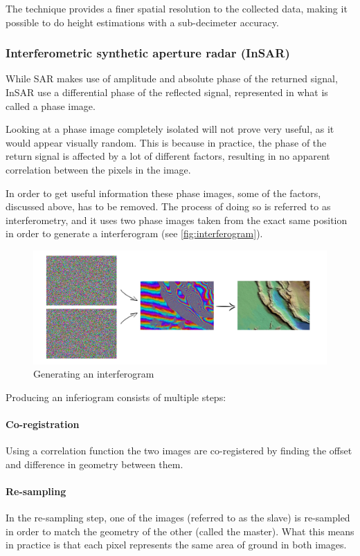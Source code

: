 The technique provides a finer spatial resolution to the collected data, making it possible to do height estimations with a sub-decimeter accuracy.

\subsubsection{Interferometric synthetic aperture radar (InSAR)}
While SAR makes use of amplitude and absolute phase of the returned signal, InSAR use a differential phase of the reflected signal, represented in what is called a phase image.

Looking at a phase image completely isolated will not prove very useful, as it would appear visually random. This is because in practice, the phase of the return signal is affected by a lot of different factors, resulting in no apparent correlation between the pixels in the image.

In order to get useful information these phase images, some of the factors, discussed above, has to be removed. The process of doing so is referred to as interferometry, and it uses two phase images taken from the exact same position in order to generate a interferogram (see \autoref{fig:interferogram}).

\begin{figure}[!h]
	\centering
	\includegraphics[scale=0.4]{fig/inferiogram.png}
	\caption{Generating an interferogram}
	\label{fig:interferogram}
\end{figure}

Producing an inferiogram consists of multiple steps:

\paragraph{Co-registration}
Using a correlation function the two images are co-registered by finding the offset and difference in geometry between them.

\paragraph{Re-sampling}
In the re-sampling step, one of the images (referred to as the slave) is re-sampled in order to match the geometry of the other (called the master). What this means in practice is that each pixel represents the same area of ground in both images.


